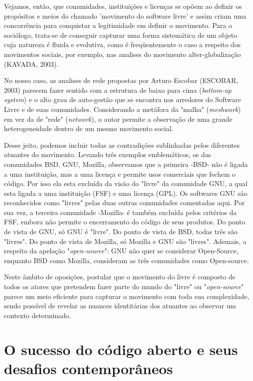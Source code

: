 Vejamos, então, que comunidades, instituições e licenças se opõem ao definir os propósitos e meios do chamado 'movimento do software livre' e assim criam uma concorrência para conquistar a legitimidade em definir o movimento. Para o sociólogo, trata-se de conseguir capturar uma forma sistemática de um objeto cuja natureza é fluida e evolutiva, como é freqüentemente o caso a respeito dos movimentos sociais, por exemplo, nas analises do movimento alter-globalização (KAVADA, 2003).

No nosso caso, as analises de rede propostas por Arturo Escobar (ESCOBAR, 2003) parecem fazer sentido com a estrutura de baixo para cima (\emph{bottom-up system}) e o alto grau de auto-gestão que se encontra nos arredores do Software Livre e de suas comunidades. Considerando a metáfora da "malha" (\emph{meshwork}) em vez da de "rede" (\emph{network}), o autor permite a observação de uma grande heterogeneidade dentro de um mesmo movimento social.

Desse jeito, podemos incluir todas as contradições sublinhadas pelos diferentes atuantes do movimento. Levando três exemplos emblemáticos, os das comunidades BSD, GNU, Mozilla, observamos que a primeira -BSD- não é ligada a uma instituição, mas a uma licença e permite usos comerciais que fechem o código. Por isso ela esta excluída da visão do "livre" da comunidade GNU, a qual esta ligada a uma instituição (FSF) e uma licença (GPL). Os softwares GNU são reconhecidos como "livres" pelas duas outras comunidades comentadas aqui. Por sua vez, a terceira comunidade -Mozilla- é também excluída pelos critérios da FSF, embora não permite o encerramento do código de seus produtos. Do ponto de vista de GNU, só GNU é "livre". Do ponto de vista de BSD, todas três são "livres". Do ponto de vista de Mozilla, só Mozilla e GNU são "livres". Ademais, a respeito da apelação "\emph{open-source}": GNU não quer se considerar Open-Source, enquanto BSD como Mozilla, consideram as três comunidades como Open-source.

Neste âmbito de oposições, postular que o movimento do livre é composto de todos os atores que pretendem fazer parte do mundo do "livre" ou "\emph{open-source}" parece um meio eficiente para capturar o movimento com toda sua complexidade, sendo possível de revelar as nuances identitárias dos atuantes ao observar um contexto determinado.

\section{O sucesso do código aberto e seus desafios contemporâneos} \label{1.4}

